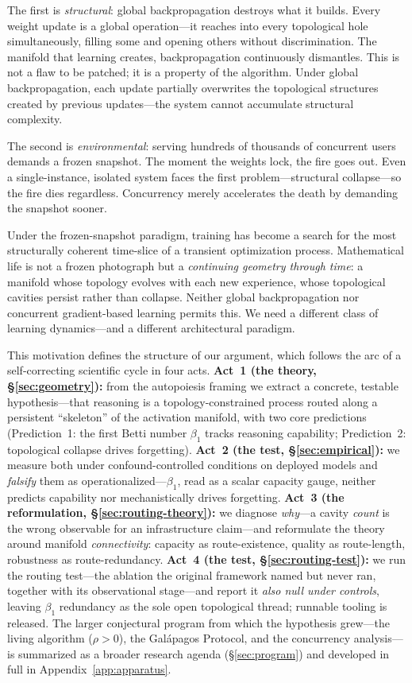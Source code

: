 \documentclass{article}
\begin{document}
The first is \emph{structural}: global backpropagation destroys what it builds. Every weight update is a global operation---it reaches into every topological hole simultaneously, filling some and opening others without discrimination. The manifold that learning creates, backpropagation continuously dismantles. This is not a flaw to be patched; it is a property of the algorithm. Under global backpropagation, each update partially overwrites the topological structures created by previous updates---the system cannot accumulate structural complexity.

The second is \emph{environmental}: serving hundreds of thousands of concurrent users demands a frozen snapshot. The moment the weights lock, the fire goes out. Even a single-instance, isolated system faces the first problem---structural collapse---so the fire dies regardless. Concurrency merely accelerates the death by demanding the snapshot sooner.

Under the frozen-snapshot paradigm, training has become a search for the most structurally coherent time-slice of a transient optimization process. Mathematical life is not a frozen photograph but a \emph{continuing geometry through time}: a manifold whose topology evolves with each new experience, whose topological cavities persist rather than collapse. Neither global backpropagation nor concurrent gradient-based learning permits this. We need a different class of learning dynamics---and a different architectural paradigm.

This motivation defines the structure of our argument, which follows the arc of a self-correcting
scientific cycle in four acts. \textbf{Act~1 (the theory, \S\ref{sec:geometry}):} from the
autopoiesis framing we extract a concrete, testable hypothesis---that reasoning is a
topology-constrained process routed along a persistent ``skeleton'' of the activation manifold,
with two core predictions (Prediction~1: the first Betti number $\beta_1$ tracks reasoning
capability; Prediction~2: topological collapse drives forgetting). \textbf{Act~2 (the test,
\S\ref{sec:empirical}):} we measure both under confound-controlled conditions on deployed models and
\emph{falsify} them as operationalized---$\beta_1$, read as a scalar capacity gauge, neither predicts
capability nor mechanistically drives forgetting. \textbf{Act~3 (the reformulation,
\S\ref{sec:routing-theory}):} we diagnose \emph{why}---a cavity \emph{count} is the wrong observable
for an infrastructure claim---and reformulate the theory around manifold \emph{connectivity}: capacity
as route-existence, quality as route-length, robustness as route-redundancy. \textbf{Act~4 (the
test, \S\ref{sec:routing-test}):} we run the routing test---the ablation the original framework named
but never ran, together with its observational stage---and report it \emph{also null under controls},
leaving $\beta_1$ redundancy as the sole open topological thread; runnable tooling is released. The
larger conjectural program from which the hypothesis grew---the living algorithm ($\rho>0$), the
Gal\'apagos Protocol, and the concurrency analysis---is summarized as a broader research agenda
(\S\ref{sec:program}) and developed in full in Appendix~\ref{app:apparatus}.
\end{document}
